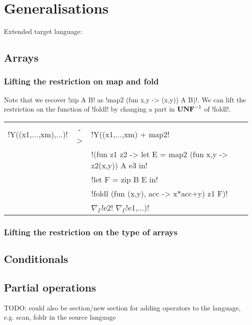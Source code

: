 \section{Generalisations}
\label{sec:generalisation}


% 

% 

Extended target language:

% 

% 

\subsection{Arrays}

\subsubsection{Lifting the restriction on map and fold}
\label{ssub:Lifting the restriction on map and fold}

Note that we recover !zip A B! as !map2 (fun x,y -> (x,y)) A B)!. 
We can lift the restriction on the function of !foldl! by changing a part in $\mathbf{UNF}^{-1}$ of !foldl!.
\begin{center}
\begin{tabular}{r c l}
    !Y((x1,...,xm),...)! & -> &  !Y((x1,...,xm) + map2! \\
        && !(fun z1 z2 -> let E = map2 (fun x,y -> z2(x,y)) A e3 in! \\
        &&  !let F = zip B E in!\\
        && !foldl (fun (x,y), acc  -> x*acc+y) z1 F)! \\
        && $\nabla_{\Gamma}$!e2! $\nabla_{\Gamma}$!e1,...)!
\end{tabular}
\end{center}

\subsubsection{Lifting the restriction on the type of arrays}
\label{ssub:Lifting the restriction on the type of arrays}


\subsection{Conditionals} 



\subsection{Partial operations} 

TODO: could also be section/new section for adding operators to the language, e.g. scan, foldr in the source language

